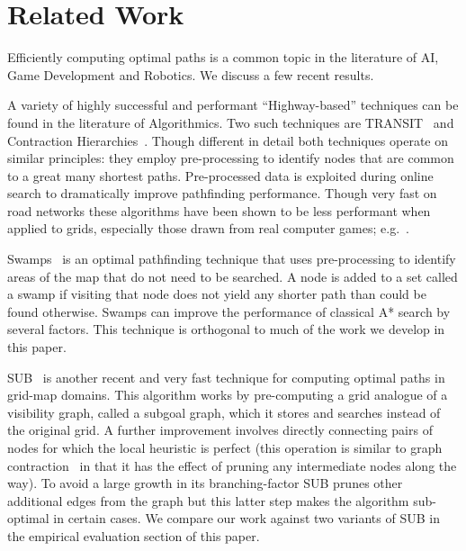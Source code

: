 \section{Related Work}
\label{sec::relatedwork}
Efficiently computing optimal paths is a common topic
in the literature of AI, Game Development and 
Robotics. We discuss a few recent results.

A variety of highly successful and performant ``Highway-based'' 
techniques can be found in the literature of Algorithmics. 
Two such techniques are TRANSIT~\cite{bast06} and Contraction
Hierarchies~\cite{geisberger08}. Though different in detail
both techniques operate on similar principles: they employ
pre-processing to identify nodes that
are common to a great many shortest paths. Pre-processed data is
exploited during online search to dramatically improve pathfinding 
performance. Though very fast on road networks these algorithms have
been shown to be less performant when applied to grids, especially
those drawn from real computer games;
e.g.~\cite{sturtevant10,antsfeld12,storandt13}.

Swamps~\cite{pochter10} is an optimal pathfinding technique
that uses pre-processing to identify areas of the map that do 
not need to be searched. A node is added to a set called a swamp
if visiting that node does not yield any shorter path than could
be found otherwise. Swamps can improve the performance of classical
A{*} search by several factors. This technique is orthogonal to much
of the work we develop in this paper.

SUB~\cite{urasKH13} is another recent and very fast technique 
for computing optimal paths in grid-map domains. 
This algorithm works by pre-computing a grid analogue of a visibility graph,
called a subgoal graph, which it stores and searches instead of the original
grid.
A further improvement involves directly connecting pairs of nodes
for which the local heuristic is perfect (this operation is similar 
to graph contraction~\cite{geisberger08} in that it has the effect of 
pruning any intermediate nodes along the way).
To avoid a large growth in its branching-factor SUB prunes other 
additional edges from the graph but this latter step makes the 
algorithm sub-optimal in certain cases. We compare our work against
two variants of SUB in the empirical evaluation section of this paper.

%
